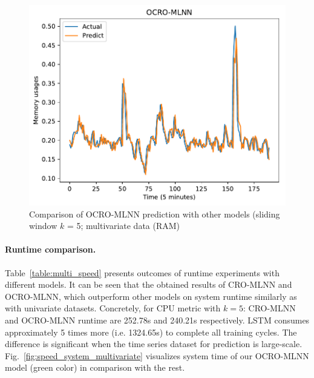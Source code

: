 \documentclass[smallcondensed, natbib]{svjour3}     %
\begin{document}
{\begin{figure}[!ht]
\begin{minipage}[b]{0.33\linewidth}
    \includegraphics[width=0.9\linewidth]{predict/k5/ram_k5_ocro_mlnn.pdf} 
  \end{minipage} 
  
  \caption{Comparison of OCRO-MLNN prediction with other models (sliding window $k$ = 5; multivariate data (RAM)} 
  \label{predict_ram_sliding5} 
\end{figure}

\paragraph{\textbf{Runtime comparison.}} Table~\ref{table:multi_speed} presents outcomes of runtime experiments with different models. It can be seen that the obtained results of CRO-MLNN and OCRO-MLNN, which outperform other models on system runtime similarly as with univariate datasets. Concretely, for CPU metric with $k = 5$: CRO-MLNN and OCRO-MLNN runtime are 252.78s and 240.21s respectively. LSTM consumes approximately 5 times more (i.e. 1324.65s) to complete all training cycles. The difference is significant when the time series dataset for prediction is large-scale. Fig.~\ref{fig:speed_system_multivariate} visualizes system time of our OCRO-MLNN model (green color) in comparison with the rest.


}
\end{document}
